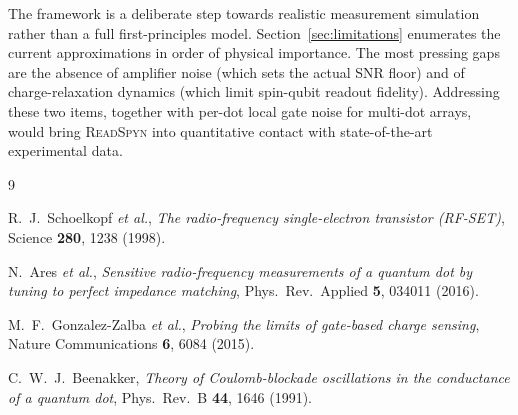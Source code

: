 \documentclass[11pt,a4paper]{article}
\begin{document}
The framework is a deliberate step towards realistic measurement simulation
rather than a full first-principles model.
Section~\ref{sec:limitations} enumerates the current approximations in order
of physical importance.
The most pressing gaps are the absence of amplifier noise (which sets the
actual SNR floor) and of charge-relaxation dynamics (which limit spin-qubit
readout fidelity).
Addressing these two items, together with per-dot local gate noise for
multi-dot arrays, would bring \textsc{ReadSpyn} into quantitative contact
with state-of-the-art experimental data.

\begin{thebibliography}{9}

R.~J.\ Schoelkopf \textit{et al.},
\textit{The radio-frequency single-electron transistor (RF-SET)},
Science \textbf{280}, 1238 (1998).

N.\ Ares \textit{et al.},
\textit{Sensitive radio-frequency measurements of a quantum dot by tuning to
perfect impedance matching},
Phys.\ Rev.\ Applied \textbf{5}, 034011 (2016).

M.~F.\ Gonzalez-Zalba \textit{et al.},
\textit{Probing the limits of gate-based charge sensing},
Nature Communications \textbf{6}, 6084 (2015).

C.~W.~J.\ Beenakker,
\textit{Theory of Coulomb-blockade oscillations in the conductance of a
quantum dot},
Phys.\ Rev.\ B \textbf{44}, 1646 (1991).

\end{thebibliography}
\end{document}
